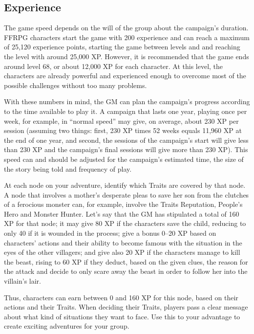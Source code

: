 \subsection{Experience}\label{subsec:gm-experience}
\begin{multicols}{2}
The game speed depends on the will of the group about the campaign’s duration. FFRPG characters start the game with 200 experience and can reach a maximum of 25,120 experience points, starting the game between levels  and  and reaching the  level with around 25,000 XP\@. However, it is recommended that the game ends around level 68, or about 12,000 XP for each character. At this level, the characters are already powerful and experienced enough to overcome most of the possible challenges without too many problems.

With these numbers in mind, the GM can plan the campaign’s progress according to the time available to play it. A campaign that lasts one year, playing once per week, for example, in “normal speed” may give, on average, about 230 XP per session (assuming two things: first, 230 XP times 52 weeks equals 11,960 XP at the end of one year, and second, the sessions of the campaign’s start will give less than 230 XP and the campaign’s final sessions will give more than 230 XP). This speed can and should be adjusted for the campaign’s estimated time, the size of the story being told and frequency of play.

At each node on your adventure, identify which Traits are covered by that node. A node that involves a mother’s desperate pleas to save her son from the clutches of a ferocious monster can, for example, involve the Traits Reputation, People’s Hero and Monster Hunter. Let's say that the GM has stipulated a total of 160 XP for that node; it may give 80 XP if the characters save the child, reducing to only 40 if it is wounded in the process; give a bonus 0--20 XP based on characters’ actions and their ability to become famous with the situation in the eyes of the other villagers; and give also 20 XP if the characters manage to kill the beast, rising to 60 XP if they deduct, based on the given clues, the reason for the attack and decide to only scare away the beast in order to follow her into the villain's lair.

Thus, characters can earn between 0 and 160 XP for this node, based on their actions and their Traits. When deciding their Traits, players pass a clear message about what kind of situations they want to face. Use this to your advantage to create exciting adventures for your group.


\end{multicols}
